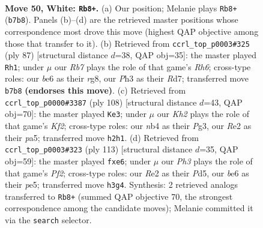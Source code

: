 \documentclass[11pt]{article}
\begin{document}
\clearpage

\begin{figure}[p]\centering
\begin{subfigure}{0.46\textwidth}\centering
\resizebox{\linewidth}{!}{%
\newchessgame
\chessboard[
  setfen={4k3/1R6/2r1bB2/rp6/1n4p1/4P1PP/4RP1K/8 w - - 0 50},
  showmover=false,
  pgfstyle=straightmove, color=movearrow, markmove={b7-b8}
]}
\caption{}
\end{subfigure}\hfill
\begin{subfigure}{0.46\textwidth}\centering
\resizebox{\linewidth}{!}{%
\newchessgame
\chessboard[
  setfen={6R1/kp1r4/p7/3N3R/1P1pK2P/7r/2P2b2/8 b - - 4 44},
  showmover=false,
  pgfstyle=straightmove, color=movearrow, markmove={h3-h1}
]}
\caption{}
\end{subfigure}
\\[4pt]
\begin{subfigure}{0.46\textwidth}\centering
\resizebox{\linewidth}{!}{%
\newchessgame
\chessboard[
  setfen={3r4/2r3k1/3p3p/p2PPR2/2p2P2/6P1/2R2K2/8 w - - 1 55},
  showmover=false,
  pgfstyle=straightmove, color=movearrow, markmove={f2-e3}
]}
\caption{}
\end{subfigure}\hfill
\begin{subfigure}{0.46\textwidth}\centering
\resizebox{\linewidth}{!}{%
\newchessgame
\chessboard[
  setfen={8/5p1r/4P2P/pk1pP3/1p1B4/5K2/2P5/7R b - - 0 57},
  showmover=false,
  pgfstyle=straightmove, color=movearrow, markmove={f7-e6}
]}
\caption{}
\end{subfigure}
\caption{\textbf{Move 50, White: \texttt{Rb8+}.} (a) Our position; Melanie plays \texttt{Rb8+} (\texttt{b7b8}). Panels (b)--(d) are the retrieved master positions whose correspondence most drove this move (highest QAP objective among those that transfer to it). (b) Retrieved from \texttt{ccrl\_top\_p0003\#325} (ply 87) [structural distance $d$=38, QAP obj=35]: the master played \texttt{Rh1}; under $\mu$ our \emph{Rb7} plays the role of that game's \emph{Rh6}; cross-type roles: our \emph{b}e6 as their \emph{r}g8, our \emph{P}h3 as their \emph{R}d7; transferred move \texttt{b7b8} \textbf{(endorses this move)}. (c) Retrieved from \texttt{ccrl\_top\_p0000\#3387} (ply 108) [structural distance $d$=43, QAP obj=70]: the master played \texttt{Ke3}; under $\mu$ our \emph{Kh2} plays the role of that game's \emph{Kf2}; cross-type roles: our \emph{n}b4 as their \emph{P}g3, our \emph{R}e2 as their \emph{p}a5; transferred move \texttt{h2h1}. (d) Retrieved from \texttt{ccrl\_top\_p0003\#323} (ply 113) [structural distance $d$=35, QAP obj=59]: the master played \texttt{fxe6}; under $\mu$ our \emph{Ph3} plays the role of that game's \emph{Pf2}; cross-type roles: our \emph{R}e2 as their \emph{P}d5, our \emph{b}e6 as their \emph{p}e5; transferred move \texttt{h3g4}. Synthesis: 2 retrieved analogs transferred to \texttt{Rb8+} (summed QAP objective 70, the strongest correspondence among the candidate moves); Melanie committed it via the \texttt{search} selector.}
\label{fig:thought-m98}
\end{figure}
\end{document}
